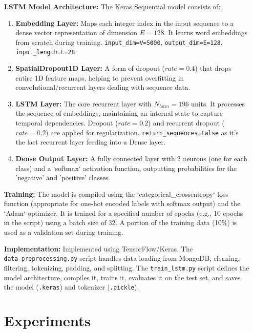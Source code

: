 \documentclass[10pt,twocolumn]{article}
\begin{document}
\textbf{LSTM Model Architecture:} The Keras Sequential model consists of:
\begin{enumerate}[label=\alph*), itemsep=0pt, topsep=3pt]
    \item \textbf{Embedding Layer:} Maps each integer index in the input sequence to a dense vector representation of dimension $E=128$. It learns word embeddings from scratch during training. \texttt{input\_dim=V=5000}, \texttt{output\_dim=E=128}, \texttt{input\_length=L=28}. %
    \item \textbf{SpatialDropout1D Layer:} A form of dropout ($rate=0.4$) that drops entire 1D feature maps, helping to prevent overfitting in convolutional/recurrent layers dealing with sequence data.
    \item \textbf{LSTM Layer:} The core recurrent layer with $N_{lstm}=196$ units. It processes the sequence of embeddings, maintaining an internal state to capture temporal dependencies. Dropout ($rate=0.2$) and recurrent dropout ($rate=0.2$) are applied for regularization. \texttt{return\_sequences=False} as it's the last recurrent layer feeding into a Dense layer. %
    \item \textbf{Dense Output Layer:} A fully connected layer with 2 neurons (one for each class) and a `softmax` activation function, outputting probabilities for the 'negative' and 'positive' classes.
\end{enumerate}

\textbf{Training:} The model is compiled using the `categorical_crossentropy` loss function (appropriate for one-hot encoded labels with softmax output) and the `Adam` optimizer. It is trained for a specified number of epochs (e.g., 10 epochs in the script) using a batch size of 32. A portion of the training data (10\%) is used as a validation set during training.

\textbf{Implementation:} Implemented using TensorFlow/Keras. The \texttt{data\_preprocessing.py} script handles data loading from MongoDB, cleaning, filtering, tokenizing, padding, and splitting. The \texttt{train\_lstm.py} script defines the model architecture, compiles it, trains it, evaluates it on the test set, and saves the model (\texttt{.keras}) and tokenizer (\texttt{.pickle}). %

\section{Experiments}
\label{sec:experiments}
\end{document}
